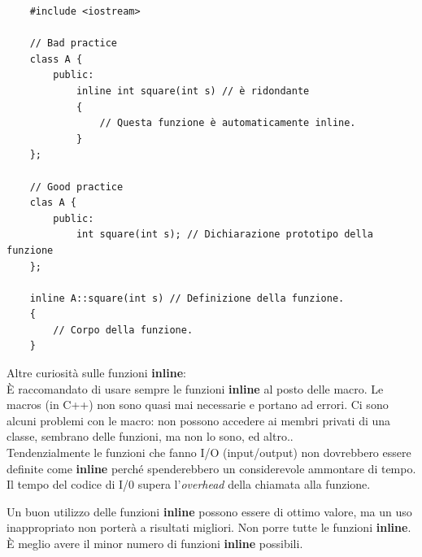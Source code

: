 \begin{lstlisting}
	#include <iostream>
	
	// Bad practice
	class A {
		public:
			inline int square(int s) // è ridondante
			{
				// Questa funzione è automaticamente inline.
			}
	};

	// Good practice
	clas A {
		public:
			int square(int s); // Dichiarazione prototipo della funzione
	};

	inline A::square(int s) // Definizione della funzione.
	{
		// Corpo della funzione.
	}
\end{lstlisting}

\textsf{\small Altre curiosità sulle funzioni \textbf{inline}: } \\

\textsf{\small È raccomandato di usare sempre le funzioni \textbf{inline} al posto delle macro. Le macros (in C++) non sono quasi mai necessarie e portano ad errori. Ci sono alcuni problemi con le macro: non possono accedere ai membri privati di una classe, sembrano delle funzioni, ma non lo sono, ed altro..} \\

\textsf{\small Tendenzialmente le funzioni che fanno I/O (input/output) non dovrebbero essere definite come \textbf{inline} perché spenderebbero un considerevole ammontare di tempo. Il tempo del codice di I/0 supera l'\emph{overhead} della chiamata alla funzione.} \break

\textsf{\small Un buon utilizzo delle funzioni \textbf{inline} possono essere di ottimo valore, ma un uso inappropriato non porterà a risultati migliori. Non porre tutte le funzioni \textbf{inline}. È meglio avere il minor numero di funzioni \textbf{inline} possibili.} \\





